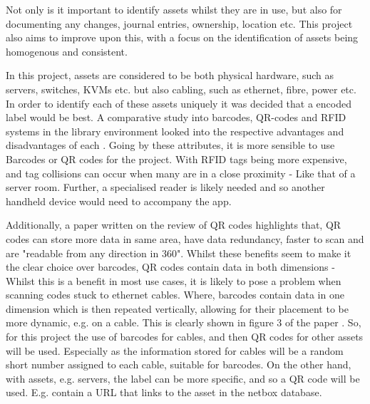 \documentclass [11pt,a4paper]{article}
\begin{document}
Not only is it important to identify assets whilst they are in use, but also for documenting any changes, journal entries, ownership, location etc.
This project also aims to improve upon this, with a focus on the identification of assets being homogenous and consistent.

In this project, assets are considered to be both physical hardware, such as servers, switches, KVMs etc. but also cabling, such as ethernet, fibre, power etc. In order to identify each of these assets uniquely it was decided that a encoded label would be best. A comparative study into barcodes, QR-codes and RFID systems in the library environment looked into the respective advantages and disadvantages of each \cite{lotlikar2013comparative}. Going by these attributes, it is more sensible to use Barcodes or QR codes for the project. With RFID tags being more expensive, and tag collisions can occur when many are in a close proximity\cite{lotlikar2013comparative} - Like that of a server room. Further, a specialised reader is likely needed and so another handheld device would need to accompany the app.

Additionally, a paper written on the review of QR codes highlights that, QR codes can store more data in same area, have data redundancy, faster to scan and are "readable from any direction in 360\degree"\cite{mishra2017review}.  Whilst these benefits seem to make it the clear choice over barcodes, QR codes contain data in both dimensions - Whilst this is a benefit in most use cases, it is likely to pose a problem when scanning codes stuck to ethernet cables. Where, barcodes contain data in one dimension which is then repeated vertically, allowing for their placement to be more dynamic, e.g. on a cable. This is clearly shown in figure 3 of the paper \cite{mishra2017review}. So, for this project the use of barcodes for cables, and then QR codes for other assets will be used. Especially as the information stored for cables will be a random short number assigned to each cable, suitable for barcodes. On the other hand, with assets, e.g. servers, the label can be more specific, and so a QR code will be used. E.g. contain a URL that links to the asset in the netbox database.
\end{document}
